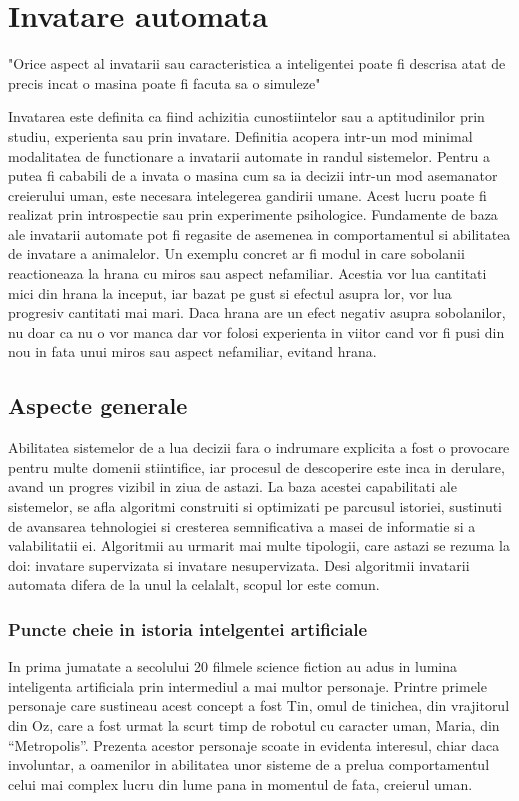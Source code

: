 
	
	\chapter{Invatare automata}
	
		\begin{center}
		"Orice aspect al invatarii sau caracteristica a inteligentei poate fi descrisa atat de precis incat o masina poate fi facuta sa o simuleze"\cite{mccarthy_proposal} 
		\end{center}
	
	Invatarea este definita ca fiind achizitia cunostiintelor sau a aptitudinilor prin studiu, experienta sau prin invatare. Definitia acopera intr-un mod minimal modalitatea de functionare a invatarii automate in randul sistemelor. Pentru a putea fi cababili de a invata o masina cum sa ia decizii intr-un mod asemanator creierului uman, este necesara intelegerea gandirii umane. Acest lucru poate fi realizat prin introspectie sau prin experimente psihologice.  
	Fundamente de baza ale invatarii automate pot fi regasite de asemenea in comportamentul si abilitatea de invatare a animalelor. Un exemplu concret ar fi modul in care sobolanii reactioneaza la hrana cu miros sau aspect nefamiliar. Acestia vor lua cantitati mici din hrana la inceput, iar bazat pe gust si efectul asupra lor, vor lua progresiv cantitati mai mari. Daca hrana are un efect negativ asupra sobolanilor, nu doar ca nu o vor manca dar vor folosi experienta in viitor cand vor fi pusi din nou in fata unui miros sau aspect nefamiliar, evitand hrana. 
	
	\section{Aspecte generale}
	Abilitatea sistemelor de a lua decizii fara o indrumare explicita a fost o provocare pentru multe domenii stiintifice, iar procesul de descoperire este inca in derulare, avand un progres vizibil in ziua de astazi. La baza acestei capabilitati ale sistemelor, se afla algoritmi construiti si optimizati pe parcusul istoriei, sustinuti de avansarea tehnologiei si cresterea semnificativa a masei de informatie si a valabilitatii ei. 
	Algoritmii au urmarit mai multe tipologii, care astazi se rezuma la doi: invatare supervizata si invatare nesupervizata. Desi algoritmii invatarii automata difera de la unul la celalalt, scopul lor este comun.
	
	\subsection{Puncte cheie in istoria intelgentei artificiale}
	In prima jumatate a secolului 20 filmele science fiction au adus in lumina inteligenta artificiala prin intermediul a mai multor personaje. Printre primele personaje care sustineau acest concept a fost Tin, omul de tinichea, din vrajitorul din Oz, care a fost urmat la scurt timp de robotul cu caracter uman, Maria, din “Metropolis”. Prezenta acestor personaje scoate in evidenta interesul, chiar daca involuntar, a oamenilor in abilitatea unor sisteme de a prelua comportamentul celui mai complex lucru din lume pana in momentul de fata, creierul uman. 
	
